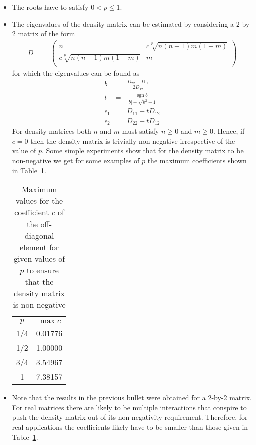 \documentclass[aip,graphicx]{revtex4-1}
\DeclareMathOperator{\sgn}{sgn}
\newcommand{\abs}[1]{| #1 |}
\begin{document}
\begin{itemize}
\item The roots have to satisfy $0 < p \le 1$.
\item The eigenvalues of the density matrix can be estimated by considering a 2-by-2 matrix of the form
      \begin{eqnarray}
      D &=& \begin{pmatrix}
            n & c\sqrt[p]{n(n-1)m(1-m)} \\
            c\sqrt[p]{n(n-1)m(1-m)} & m \\
            \end{pmatrix}
      \end{eqnarray}
      for which the eigenvalues can be found as
      \begin{eqnarray}
      b &=& \frac{D_{22}-D_{11}}{2D_{12}} \\
      t &=& \frac{\sgn{b}}{\abs{b}+\sqrt{b^2+1}} \\
      \epsilon_1 &=& D_{11} - t D_{12} \\
      \epsilon_2 &=& D_{22} + t D_{12}
      \end{eqnarray}
      For density matrices both $n$ and $m$ must satisfy $n \ge 0$ and $m \ge 0$. Hence, if $c = 0$ then the density matrix is trivially non-negative irrespective of the value of $p$. Some simple experiments show that for the density matrix to be non-negative we get for some examples of $p$ the maximum coefficients shown in Table~\ref{table:max_c}.
      \begin{table}
      \begin{tabular}{|c|c|}
      \hline\hline 
      $p$ & $\max c$ \\
      \hline
      1/4 & 0.01776 \\
      1/2 & 1.00000 \\
      3/4 & 3.54967 \\
      1   & 7.38157 \\
      \hline\hline
      \end{tabular}
      \caption{Maximum values for the coefficient $c$ of the off-diagonal element for given values of $p$ to ensure that the density matrix is non-negative}
      \label{table:max_c}
      \end{table}
\item Note that the results in the previous bullet were obtained for a 2-by-2 matrix. For real matrices there are likely to be multiple interactions that conspire to push the density matrix out of its non-negativity requirement. Therefore, for real applications the coefficients likely have to be smaller than those given in Table~\ref{table:max_c}.

\end{itemize}
\end{document}
